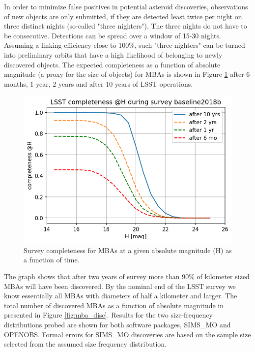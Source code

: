 In order to minimize false positives in potential asteroid discoveries, observations of new objects are only submitted, if they are detected least twice per night on three distinct nights (so-called "three nighters"). The three nights do not have to be consecutive. Detections can be spread over a window of 15-30 nights. Assuming a linking efficiency close to 100\%, such "three-nighters" can be turned into preliminary orbits that have a high likelihood of belonging to newly discovered objects. 
The expected completeness as a function of absolute magnitude (a proxy for the size of objects) for MBAs is shown in Figure \ref{fig:mba_compl} after 6 months, 1 year, 2 years and after 10 years of \gls{LSST} operations.
\begin{figure}[b!]
\begin{center}
\includegraphics[scale=0.7]{figs/mba_completeness3.png}
\end{center}
\caption{Survey completeness for MBAs at a given absolute magnitude (H) as a function of time.}
\label{fig:mba_compl}       %
\end{figure}
%
The graph shows that after two years of survey more than 90\% of kilometer sized MBAs will have been discovered.
By the nominal end of the \gls{LSST} survey we know essentially all MBAs with diameters of half a kilometer and larger.
The total number of discovered MBAs as a function of absolute magnitude in presented in Figure \ref{fig:mba_disc}. Results for the two  size-frequency distributions probed are 
shown for both software packages, SIMS\_MO and OPENOBS. Formal errors for SIMS\_MO discoveries are based on the sample size selected from the assumed size frequency distribution.  
